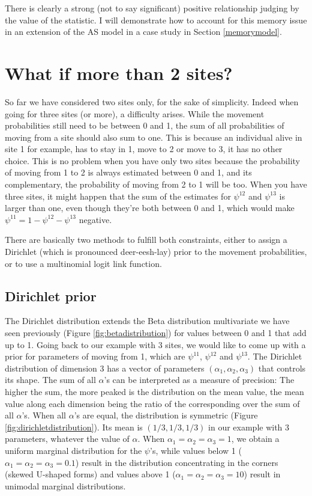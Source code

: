 \documentclass[
  12pt,
]{krantz}
\begin{document}
There is clearly a strong (not to say significant) positive relationship judging by the value of the statistic. I will demonstrate how to account for this memory issue in an extension of the AS model in a case study in Section \ref{memorymodel}.

\section{What if more than 2 sites?}\label{what-if-more-than-2-sites}

So far we have considered two sites only, for the sake of simplicity. Indeed when going for three sites (or more), a difficulty arises. While the movement probabilities still need to be between 0 and 1, the sum of all probabilities of moving from a site should also sum to one. This is because an individual alive in site 1 for example, has to stay in 1, move to 2 or move to 3, it has no other choice. This is no problem when you have only two sites because the probability of moving from 1 to 2 is always estimated between 0 and 1, and its complementary, the probability of moving from 2 to 1 will be too. When you have three sites, it might happen that the sum of the estimates for \(\psi^{12}\) and \(\psi^{13}\) is larger than one, even though they're both between 0 and 1, which would make \(\psi^{11} = 1 - \psi^{12} - \psi^{13}\) negative.

There are basically two methods to fulfill both constraints, either to assign a Dirichlet (which is pronounced deer-eesh-lay) prior to the movement probabilities, or to use a multinomial logit link function.

\subsection{Dirichlet prior}\label{dirichletprior}

The Dirichlet distribution extends the Beta distribution multivariate we have seen previously (Figure \ref{fig:betadistribution}) for values between 0 and 1 that add up to 1. Going back to our example with 3 sites, we would like to come up with a prior for parameters of moving from 1, which are \(\psi^{11}\), \(\psi^{12}\) and \(\psi^{13}\). The Dirichlet distribution of dimension 3 has a vector of parameters \((\alpha_1, \alpha_2, \alpha_3)\) that controls its shape. The sum of all \(\alpha\)'s can be interpreted as a measure of precision: The higher the sum, the more peaked is the distribution on the mean value, the mean value along each dimension being the ratio of the corresponding over the sum of all \(\alpha\)'s. When all \(\alpha\)'s are equal, the distribution is symmetric (Figure \ref{fig:dirichletdistribution}). Its mean is \((1/3, 1/3, 1/3)\) in our example with 3 parameters, whatever the value of \(\alpha\). When \(\alpha_1 = \alpha_2 = \alpha_3 = 1\), we obtain a uniform marginal distribution for the \(\psi\)'s, while values below 1 (\(\alpha_1 = \alpha_2 = \alpha_3 = 0.1\)) result in the distribution concentrating in the corners (skewed U-shaped forms) and values above 1 (\(\alpha_1 = \alpha_2 = \alpha_3 = 10\)) result in unimodal marginal distributions.
\end{document}
